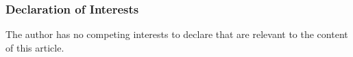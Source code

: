 \documentclass{llncs}
\begin{document}










\begin{small}
\subsubsection{Declaration of Interests}
The author has no competing interests to declare that are relevant to the content of this article.
\end{small}
\end{document}
